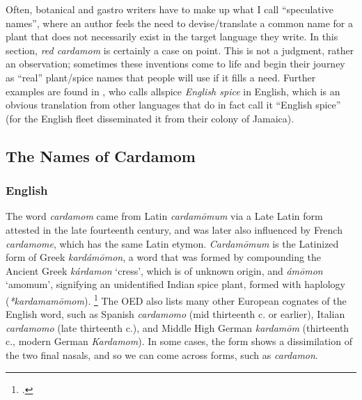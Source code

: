 Often, botanical and gastro writers have to make up what I call ``speculative names'', where an author feels the need to devise/translate a common name for a plant that does not necessarily exist in the target language they write. In this section, \textit{red cardamom} is certainly a case on point. This is not a judgment, rather an observation; sometimes these inventions come to life and begin their journey as ``real'' plant/spice names that people will use if it fills a need. Further examples are found in \textcite[64]{raghavan_handbook_2007}, who calls allspice \textit{English spice} in English, which is an obvious translation from other languages that do in fact call it ``English spice'' (for the English fleet disseminated it from their colony of Jamaica).

\subsection{The Names of Cardamom}

\subsubsection{English}





The word \textit{cardamom} came from Latin \textit{cardamōmum} via a Late Latin form attested in the late fourteenth century, and was later also influenced by French \textit{cardamome}, which has the same Latin etymon. \textit{Cardamōmum} is the Latinized form of Greek  \textit{kardámōmon}, a word that was formed by compounding the Ancient Greek  \textit{kárdamon} `cress', which is of unknown origin, and  \textit{ámōmon} `amomum', signifying an unidentified Indian spice plant, formed with haplology (\textit{*kardamamōmom}). \footcites[cardamom]{oed}[cardamom]{ahd} The \gls{OED} also lists many other European cognates of the English word, such as Spanish \textit{cardamomo} (mid thirteenth c. or earlier), Italian \textit{cardamomo} (late thirteenth c.), and Middle High German \textit{kardamōm} (thirteenth c., modern German \textit{Kardamom}).
In some cases, the form shows a dissimilation of the two final nasals, and so we can come across forms, such as \textit{cardamon}.



